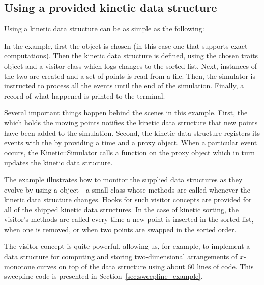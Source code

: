 \subsection{Using a provided kinetic data structure}
\label{sec:sort_example}

Using a kinetic data structure can be as simple as the following:
\label{fig:sort_program}

In the example, first the  object is chosen
(in this case one that supports exact computations). Then the kinetic
data structure is defined, using the chosen traits object and a
visitor class which logs changes to the sorted list.  Next, instances
of the two are created and a set of points is read from a file. Then,
the simulator is instructed to process all the events until the end of
the simulation.  Finally, a record of what happened is printed to the
terminal.

Several important things happen behind the scenes in this example.
First, the  which holds the moving points
notifies the kinetic data structure that new points have been added to
the simulation. Second, the  kinetic data structure
registers its events with the  by providing a time
and a proxy object. When a particular event occurs, the
Kinetic::Simulator calls a function on the proxy object which in turn
updates the kinetic data structure.

The example illustrates how to monitor the supplied data structures as
they evolve by using a  object---a small class whose
methods are called whenever the kinetic data structure changes. Hooks
for such visitor concepts are provided for all of the shipped kinetic
data structures. In the case of kinetic sorting, the visitor's
methods are called every time a new point is inserted in the sorted
list, when one is removed, or when two points are swapped in the
sorted order. 


The visitor concept is quite powerful, allowing us, for example, to
implement a data structure for computing and storing two-dimensional
arrangements of $x$-monotone curves on top of the
 data structure using about 60
lines of code. This sweepline code is presented in
Section~\ref{sec:sweepline_example}.
